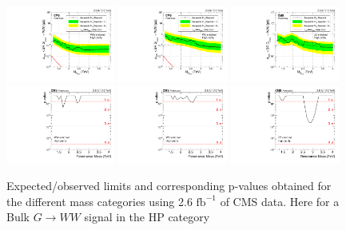 \begin{figure}[h!]
\centering
\includegraphics[width=0.32\textwidth]{figures/analysis/search1/AN-15-211/limits/brazilianFlag_BulkWW_WWHP_13TeV_wPDF.pdf}
\includegraphics[width=0.32\textwidth]{figures/analysis/search1/AN-15-211/limits/brazilianFlag_BulkWW_WZHP_13TeV_wPDF.pdf}
\includegraphics[width=0.32\textwidth]{figures/analysis/search1/AN-15-211/limits/brazilianFlag_BulkWW_ZZHP_13TeV_wPDF.pdf}\\
\includegraphics[width=0.32\textwidth]{figures/analysis/search1/AN-15-211/pvalues/pvalue_BulkWWinWW_high_purity.pdf}
\includegraphics[width=0.32\textwidth]{figures/analysis/search1/AN-15-211/pvalues/pvalue_BulkWWinWZ_high_purity.pdf}
\includegraphics[width=0.32\textwidth]{figures/analysis/search1/AN-15-211/pvalues/pvalue_BulkWWinZZ_high_purity.pdf}
\caption{Expected/observed limits and corresponding p-values obtained for the different mass categories using 2.6 $\textrm{fb}^{-1}$ of CMS data. Here for a Bulk $G\rightarrow WW$ signal in the HP category}
\label{fig:searchI:Limits_HPBulkWW}
\end{figure}


